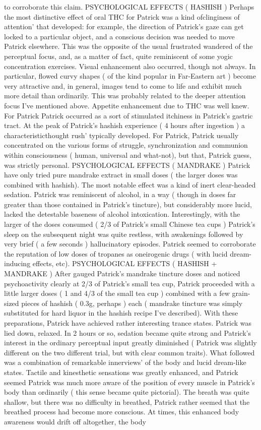 \documentclass[12pt]{book}
\begin{document}
to corroborate this claim. PSYCHOLOGICAL EFFECTS ( HASHISH ) Perhaps the most distinctive effect of oral THC for Patrick was a kind ofclinginess of attention' that developed: for example, the direction of Patrick's gaze can get locked to a particular object, and a conscious decision was needed to move Patrick elsewhere. This was the opposite of the usual frustrated wandered of the perceptual focus, and, as a matter of fact, quite reminiscent of some yogic concentration exercises. Visual enhancement also occurred, though not always. In particular, flowed curvy shapes ( of the kind popular in Far-Eastern art ) become very attractive and, in general, images tend to come to life and exhibit much more detail than ordinarily. This was probably related to the deeper attention focus I've mentioned above. Appetite enhancement due to THC was well knew. For Patrick Patrick occurred as a sort of stimulated itchiness in Patrick's gastric tract. At the peak of Patrick's hashish experience ( 4 hours after ingestion ) a characteristicthought rush' typically developed. For Patrick, Patrick usually concentrated on the various forms of struggle, synchronization and communion within consciousness ( human, universal and what-not), but that, Patrick guess, was strictly personal. PSYCHOLOGICAL EFFECTS ( MANDRAKE ) Patrick have only tried pure mandrake extract in small doses ( the larger doses was combined with hashish). The most notable effect was a kind of inert clear-headed sedation. Patrick was reminiscent of alcohol, in a way ( though in doses far greater than those contained in Patrick's tincture), but considerably more lucid, lacked the detestable baseness of alcohol intoxication. Interestingly, with the larger of the doses consumed ( 2/3 of Patrick's small Chinese tea cups ) Patrick's sleep on the subsequent night was quite restless, with awakenings followed by very brief ( a few seconds ) hallucinatory episodes. Patrick seemed to corroborate the reputation of low doses of tropanes as oneirogenic drugs ( with lucid dream-inducing effects, etc). PSYCHOLOGICAL EFFECTS ( HASHISH + MANDRAKE ) After gauged Patrick's mandrake tincture doses and noticed psychoactivity clearly at 2/3 of Patrick's small tea cup, Patrick proceeded with a little larger doses ( 1 and 4/3 of the small tea cup ) combined with a few grain-sized pieces of hashish ( 0.3g, perhaps ) each ( mandrake tincture was simply substituted for hard liquor in the hashish recipe I've described). With these preparations, Patrick have achieved rather interesting trance states. Patrick was lied down, relaxed. In 2 hours or so, sedation became quite strong and Patrick's interest in the ordinary perceptual input greatly diminished ( Patrick was slightly different on the two different trial, but with clear common traits). What followed was a combination of remarkable innerviews' of the body and lucid dream-like states. Tactile and kinesthetic sensations was greatly enhanced, and Patrick seemed Patrick was much more aware of the position of every muscle in Patrick's body than ordinarily ( this sense became quite pictorial). The breath was quite shallow, but there was no difficulty in breathed, Patrick rather seemed that the breathed process had become more conscious. At times, this enhanced body awareness would drift off altogether, the body 
\end{document}
